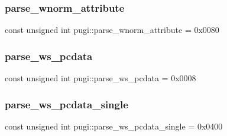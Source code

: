\subsubsection{\texorpdfstring{parse\+\_\+wnorm\+\_\+attribute}{parse\_wnorm\_attribute}}
{\footnotesize\ttfamily const unsigned int pugi\+::parse\+\_\+wnorm\+\_\+attribute = 0x0080}

\mbox{\label{namespacepugi_ae492a24302294f1ce3fbd56f2edbf131}} 
\subsubsection{\texorpdfstring{parse\+\_\+ws\+\_\+pcdata}{parse\_ws\_pcdata}}
{\footnotesize\ttfamily const unsigned int pugi\+::parse\+\_\+ws\+\_\+pcdata = 0x0008}

\mbox{\label{namespacepugi_ae7c892ad8288b363daca0c3e1a8e38ee}} 
\subsubsection{\texorpdfstring{parse\+\_\+ws\+\_\+pcdata\+\_\+single}{parse\_ws\_pcdata\_single}}
{\footnotesize\ttfamily const unsigned int pugi\+::parse\+\_\+ws\+\_\+pcdata\+\_\+single = 0x0400}

